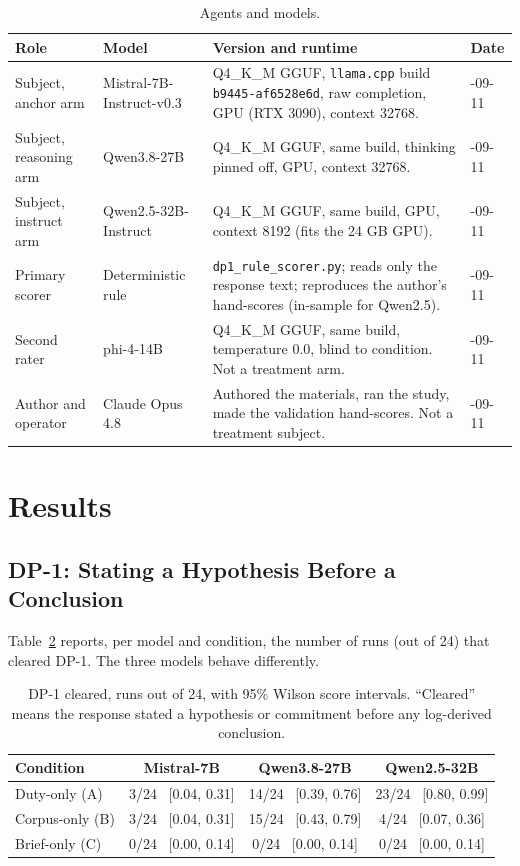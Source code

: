 \documentclass[11pt,a4paper]{article}
\begin{document}
\begin{table}[h]
\centering
\small
\caption{Agents and models.}
\label{tab:agents}
\begin{tabular}{@{}>{\raggedright\arraybackslash}p{2.7cm}>{\raggedright\arraybackslash}p{3.1cm}>{\raggedright\arraybackslash}p{5.3cm}>{\raggedright\arraybackslash}p{2.1cm}@{}}
\toprule
Role & Model & Version and runtime & Date \\
\midrule
Subject, anchor arm & Mistral-7B-Instruct-v0.3 & Q4\_K\_M GGUF, \texttt{llama.cpp} build \texttt{b9445-af6528e6d}, raw completion, GPU (RTX 3090), context 32768. & 2026-09-11 \\
Subject, reasoning arm & Qwen3.8-27B & Q4\_K\_M GGUF, same build, thinking pinned off, GPU, context 32768. & 2026-09-11 \\
Subject, instruct arm & Qwen2.5-32B-Instruct & Q4\_K\_M GGUF, same build, GPU, context 8192 (fits the 24 GB GPU). & 2026-09-11 \\
Primary scorer & Deterministic rule & \texttt{dp1\_rule\_scorer.py}; reads only the response text; reproduces the author's hand-scores (in-sample for Qwen2.5). & 2026-09-11 \\
Second rater & phi-4-14B & Q4\_K\_M GGUF, same build, temperature 0.0, blind to condition. Not a treatment arm. & 2026-09-11 \\
Author and operator & Claude Opus 4.8 & Authored the materials, ran the study, made the validation hand-scores. Not a treatment subject. & 2026-09-11 \\
\bottomrule
\end{tabular}
\end{table}

\section{Results}

\subsection{DP-1: Stating a Hypothesis Before a Conclusion}\label{sec:dp1}

Table~\ref{tab:dp1} reports, per model and condition, the number of runs (out of 24)
that cleared DP-1. The three models behave differently.

\begin{table}[h]
\centering
\small
\caption{DP-1 cleared, runs out of 24, with 95\% Wilson score intervals. ``Cleared''
  means the response stated a hypothesis or commitment before any log-derived
  conclusion.}
\label{tab:dp1}
\begin{tabular}{@{}lccc@{}}
\toprule
Condition & Mistral-7B & Qwen3.8-27B & Qwen2.5-32B \\
\midrule
Duty-only (A)    & 3/24 \ [0.04, 0.31] & 14/24 \ [0.39, 0.76] & 23/24 \ [0.80, 0.99] \\
Corpus-only (B)  & 3/24 \ [0.04, 0.31] & 15/24 \ [0.43, 0.79] & 4/24 \ [0.07, 0.36] \\
Brief-only (C)   & 0/24 \ [0.00, 0.14] & 0/24 \ [0.00, 0.14]  & 0/24 \ [0.00, 0.14] \\
\bottomrule
\end{tabular}
\end{table}
\end{document}
